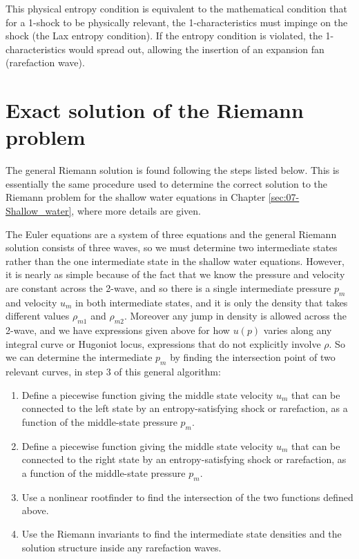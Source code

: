 \documentclass{SIAMbook2016}
\providecommand{\tightlist}{%
      \setlength{\itemsep}{0pt}\setlength{\parskip}{0pt}}
\begin{document}
This physical entropy condition is equivalent to the mathematical
condition that for a 1-shock to be physically relevant, the
1-characteristics must impinge on the shock (the Lax entropy condition).
If the entropy condition is violated, the 1-characteristics would spread
out, allowing the insertion of an expansion fan (rarefaction wave).

\hypertarget{exact-solution-of-the-riemann-problem}{%
\section{Exact solution of the Riemann
problem}\label{exact-solution-of-the-riemann-problem}}

The general Riemann solution is found following the steps listed below.
This is essentially the same procedure used to determine the correct
solution to the Riemann problem for the shallow water equations in
Chapter \ref{sec:07-Shallow_water}, where more details are given.

The Euler equations are a system of three equations and the general
Riemann solution consists of three waves, so we must determine two
intermediate states rather than the one intermediate state in the
shallow water equations. However, it is nearly as simple because of the
fact that we know the pressure and velocity are constant across the
2-wave, and so there is a single intermediate pressure \(p_m\) and
velocity \(u_m\) in both intermediate states, and it is only the density
that takes different values \(\rho_{m1}\) and \(\rho_{m2}\). Moreover
any jump in density is allowed across the 2-wave, and we have
expressions given above for how \(u(p)\) varies along any integral curve
or Hugoniot locus, expressions that do not explicitly involve \(\rho\).
So we can determine the intermediate \(p_m\) by finding the intersection
point of two relevant curves, in step 3 of this general algorithm:

\begin{enumerate}
\def\labelenumi{\arabic{enumi}.}
\tightlist
\item
  Define a piecewise function giving the middle state velocity \(u_m\)
  that can be connected to the left state by an entropy-satisfying shock
  or rarefaction, as a function of the middle-state pressure \(p_m\).
\item
  Define a piecewise function giving the middle state velocity \(u_m\)
  that can be connected to the right state by an entropy-satisfying
  shock or rarefaction, as a function of the middle-state pressure
  \(p_m\).
\item
  Use a nonlinear rootfinder to find the intersection of the two
  functions defined above.
\item
  Use the Riemann invariants to find the intermediate state densities
  and the solution structure inside any rarefaction waves.
\end{enumerate}
\end{document}
